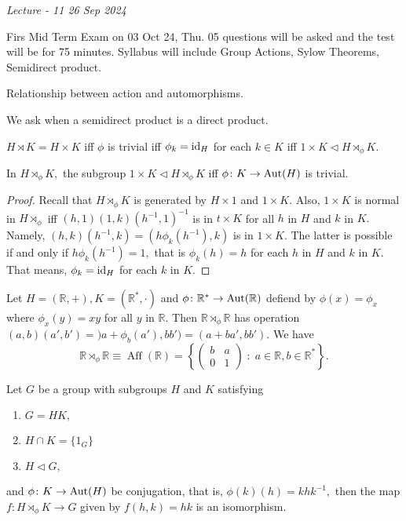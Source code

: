 \noindent\emph{Lecture - 11 \hfill 26 Sep 2024}

Firs Mid Term Exam on 03 Oct 24, Thu.
05 questions will be asked and the test will be for 75 minutes.
Syllabus will include Group Actions, Sylow Theorems, Semidirect product.

Relationship between action and automorphisms.


We ask when a semidirect product is a direct product.

$H \rtimes K = H \times K$ iff
$ \phi $ is trivial iff $ \phi_k = \operatorname{id}_H$ for each $k \in K$
iff $1 \times  K \triangleleft H \rtimes_ \phi K.$


\begin{theorem}
	In $H \rtimes _ \phi K,$ the subgroup $1 \times  K \triangleleft H \rtimes _ \phi K$
	iff $ \phi \colon K \to \operatorname{Aut}(H)$ is trivial.	
\end{theorem}

\begin{proof}
	Recall that $ H \rtimes _ \phi K $ is generated by $H \times  1$ and $ 1 \times  K.$
	Also, $ 1 \times  K$ is normal in $H \rtimes_ \phi$ iff 
	$ (h, 1 ) ( 1,k) ( h^{-1}, 1)^{-1}$ is in $ t \times K$ for 
	all $ h $ in $ H$ and $ k $ in $ K.$ Namely,
	$(h,k)(h^{-1},k) = (h \phi_k(h^{-1}), k) $ is in $ 1 \times  K.$
	The latter is possible if and only if $ h \phi_k(h^{-1}) = 1,$ that is $\phi_k(h) = h$
	for each $ h$ in $H$ and $k$ in $K.$ That means, $\phi_k = \operatorname{id}_H$ for each $k$ in $K.$
\end{proof}

\begin{example}
	Let $ H = (\mathbb{R}, +), K = (\mathbb{R}^\ast, \cdot)$ and $ \phi \colon \mathbb{R}
	^\ast \to \operatorname{Aut}(\mathbb{R})$ defiend by $ \phi(x) = \phi_x$ where $ \phi_x(y) = xy$
	for all $y$ in $\mathbb{R}.$
	Then $\mathbb{R} \rtimes_ \phi \mathbb{R}$ has operation 
	$(a,b)(a',b') = )a + \phi_b(a'), bb') = (a + ba',bb').$
	We have $$\mathbb{R} \rtimes _\phi \mathbb{R} \equiv \operatorname{Aff}(\mathbb{R})
	 = \left\{ 
	 \begin{pmatrix}
	  b & a \\ 0 & 1 \end{pmatrix} \; : \; a \in \mathbb{R}, b \in \mathbb{R}^\ast 
  \right\} .$$
\end{example}

\begin{theorem}
	Let $G$ be a group with subgroups $H$ and $K$ satisfying 
	\begin{enumerate}
		\item $ G = HK, $ 
		\item $ H \cap K = \{ 1_G \} $ 
		\item $ H \triangleleft G ,$ 
	\end{enumerate}
	and $ \phi \colon K \to \operatorname{Aut}(H)$ be conjugation, that is,
	$\phi(k)(h) = k h k^{-1},$ then the map $f \colon H \rtimes_\phi
	K \to G$ given by $f(h,k) = hk$ is an isomorphism.
\end{theorem}

